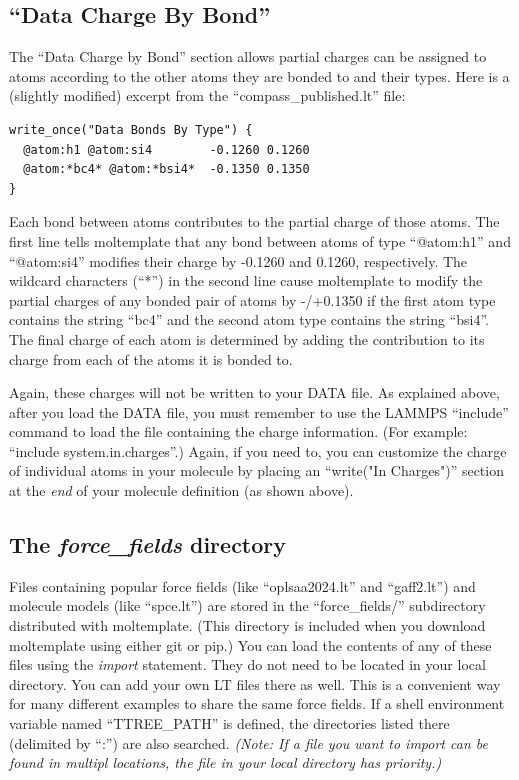 \documentclass[11pt]{article}
\begin{document}
\subsection{``Data Charge By Bond''}
\label{sec:charge_by_bond}

The ``Data Charge by Bond'' section allows partial charges can be assigned
to atoms according to the other atoms they are bonded to and their types.
Here is a (slightly modified) excerpt from the ``compass\_published.lt'' file:
\begin{verbatim}
write_once("Data Bonds By Type") {
  @atom:h1 @atom:si4        -0.1260 0.1260
  @atom:*bc4* @atom:*bsi4*  -0.1350 0.1350
}
\end{verbatim}
Each bond between atoms contributes to the partial charge of those atoms.
The first line tells moltemplate that any bond between atoms of type
``@atom:h1'' and ``@atom:si4'' modifies their charge by
-0.1260 and 0.1260, respectively.
The wildcard characters (``*'') in the second line cause moltemplate to modify
the partial charges of any bonded pair of atoms by -/+0.1350 if the first atom
type contains the string ``bc4'' and the second atom type contains the string
``bsi4''.
The final charge of each atom is determined by adding the contribution to its
charge from each of the atoms it is bonded to.

Again, these charges will not be written to your DATA file.  As explained above,
after you load the DATA file, you must remember to use the LAMMPS ``include''
command to load the file containing the charge information.
(For example: ``include system.in.charges''.)
Again, if you need to, you can customize the
charge of individual atoms in your molecule by placing an
``write("In Charges")'' section at the \textit{end} of your molecule definition
(as shown above).


\subsection{The \textit{force\_fields} directory}
\label{sec:moltemplate_path}
Files containing popular force fields (like ``oplsaa2024.lt'' and ``gaff2.lt'')
and molecule models (like ``spce.lt'') are stored in the ``force\_fields/''
subdirectory distributed with moltemplate.  (This directory is included when
you download moltemplate using either git or pip.)
You can load the contents of any of these files using the \textit{import}
statement.  They do not need to be located in your local directory.
You can add your own LT files there as well.  This is a convenient
way for many different examples to share the same force fields.
If a shell environment variable named ``TTREE\_PATH'' is defined,
the directories listed there (delimited by ``:'') are also searched.
\textit{(Note: If a file you want to import can be found in multipl locations,
the file in your local directory has priority.)}
\end{document}
